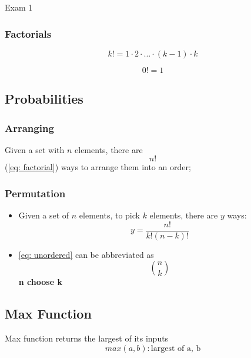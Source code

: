 \documentclass{note}
\begin{document}
\begin{note}{Exam 1}
        \subsubsection{Factorials}
        \begin{equation}\label{eq: factorial}
            k ! = 1 \cdot 2 \cdot ... \cdot \left(k - 1\right) \cdot k
        \end{equation}

        \begin{displaymath}
            0 ! = 1
        \end{displaymath}

        \subsection{Probabilities}

        \subsubsection{Arranging}
        Given a set with $ n $ elements, there are 
        \begin{equation} \label{eq: arranging}
            n!
        \end{equation}
        (\ref{eq: factorial}) ways to arrange them into an order;

        \subsubsection{Permutation}
        \begin{itemize}
            \item Given a set of $ n $ elements, to pick $ k $ elements, there are $ y $ ways:
            \begin{equation}\label{eq: unordered}
                y = \frac{n!}{k! \left(n - k\right)!} 
            \end{equation}

            \item \ref{eq: unordered} can be abbreviated as 
            \begin{equation} \label{eq: abbrievated unordered}
                \binom{n}{k}
            \end{equation}
            \textbf{n choose k}
        \end{itemize}
        
        \subsection{Max Function}
        Max function returns the largest of its inputs
        \begin{equation}\label{eq: large func}
            max(a, b): \text{largest of a, b}
        \end{equation}


\end{note}
\end{document}

